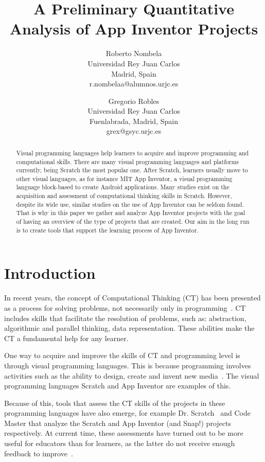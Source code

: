 \documentclass[a4paper]{article}
\title{A Preliminary Quantitative Analysis of App Inventor Projects}
\author{
Roberto Nombela \\ Universidad Rey Juan Carlos\\
                Madrid, Spain \\ r.nombelaa@alumnos.urjc.es
\and
Gregorio Robles \\Universidad Rey Juan Carlos \\
                Fuenlabrada, Madrid, Spain \\grex@gsyc.urjc.es
}
\begin{document}
\maketitle

\begin{abstract}
Visual programming languages help learners to acquire and improve programming and computational skills.
There are many visual programming languages and platforms currently, being Scratch the most popular one.
After Scratch, learners usually move to other visual languages, as for instance MIT App Inventor, a visual programming language block-based to create Android applications.
Many studies exist on the acquisition and assessment of computational thinking skills in Scratch.
However, despite its wide use, similar studies on the use of App Inventor can be seldom found.
That is why in this paper we gather and analyze App Inventor projects with the goal of having an overview of the type of projects that are created.
Our aim in the long run is to create tools that support the learning process of App Inventor.
\end{abstract}


\section{Introduction}
In recent years, the concept of Computational Thinking (CT) has been presented as a process for solving problems, not necessarily only in programming~\cite{wing2006computational}. 
CT includes skills that facilitate the resolution of problems, such as: abstraction, algorithmic and parallel thinking, data representation. These abilities make the CT a fundamental help for any learner.

One way to acquire and improve the skills of CT and programming level is through visual programming languages. This is because programming involves activities such as the ability to design, create and invent new media~\cite{resnick2009scratch}. The visual programming languages Scratch and App Inventor are examples of this.

Because of this, tools that assess the CT skills of the projects in these programming languages have also emerge, for example Dr. Scratch~\cite{moreno2015dr} and Code Master that analyze the Scratch and App Inventor (and Snap!) projects respectively. 
At current time, these assessments have turned out to be more useful for educators than for learners, as the latter do not receive enough feedback to improve~\cite{robles2018ontools}.
\end{document}
